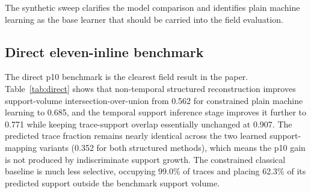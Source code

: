 \documentclass[preprint,12pt]{elsarticle}
\begin{document}
\begin{table}[t]
\centering
\small
\caption{Synthetic benchmark results. Classical results are deterministic. Machine learning results are reported as mean $\pm$ standard deviation across three seeds.}
\label{tab:synthetic}
\end{table}

The synthetic sweep clarifies the model comparison and identifies plain machine learning as the base learner that should be carried into the field evaluation.

\subsection{Direct eleven-inline benchmark}

The direct p10 benchmark is the clearest field result in the paper. Table~\ref{tab:direct} shows that non-temporal structured reconstruction improves support-volume intersection-over-union from 0.562 for constrained plain machine learning to 0.685, and the temporal support inference stage improves it further to 0.771 while keeping trace-support overlap essentially unchanged at 0.907. The predicted trace fraction remains nearly identical across the two learned support-mapping variants (0.352 for both structured methods), which means the p10 gain is not produced by indiscriminate support growth. The constrained classical baseline is much less selective, occupying 99.0\% of traces and placing 62.3\% of its predicted support outside the benchmark support volume.
\end{document}
